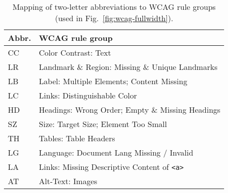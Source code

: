 \begin{table}[!ht]
\centering
\caption{Mapping of two-letter abbreviations to WCAG rule groups (used in Fig.~\ref{fig:wcag-fullwidth}).}
\label{tab:abbr}
\begin{tabularx}{\linewidth}{@{} l X @{}}
\toprule
\textbf{Abbr.} & \textbf{WCAG rule group} \\
\midrule
CC & Color Contrast: Text \\ 
LR & Landmark \& Region: Missing \& Unique Landmarks \\
LB & Label: Multiple Elements; Content Missing \\
LC & Links: Distinguishable Color \\
HD & Headings: Wrong Order; Empty \& Missing Headings \\
SZ & Size: Target Size; Element Too Small \\
TH & Tables: Table Headers \\
LG & Language: Document Lang Missing / Invalid \\
LA & Links: Missing Descriptive Content of \texttt{<a>} \\
AT & Alt-Text: Images \\
\bottomrule
\end{tabularx}
\end{table}
